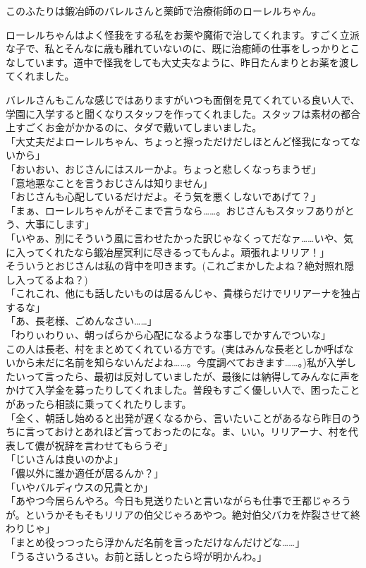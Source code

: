 \documentclass[oneside, a4paper]{jsbook}
\begin{document}
このふたりは鍛冶師のバレルさんと薬師で治療術師のローレルちゃん。

ローレルちゃんはよく怪我をする私をお薬や魔術で治してくれます。すごく立派な子で、私とそんなに歳も離れていないのに、既に治癒師の仕事をしっかりとこなしています。道中で怪我をしても大丈夫なように、昨日たんまりとお薬を渡してくれました。

バレルさんもこんな感じではありますがいつも面倒を見てくれている良い人で、学園に入学すると聞くなりスタッフを作ってくれました。スタッフは素材の都合上すごくお金がかかるのに、タダで戴いてしまいました。\\

\noindent
「大丈夫だよローレルちゃん、ちょっと擦っただけだしほとんど怪我になってないから」\\
「おいおい、おじさんにはスルーかよ。ちょっと悲しくなっちまうぜ」\\
「意地悪なことを言うおじさんは知りません」\\
「おじさんも心配しているだけだよ。そう気を悪くしないであげて？」\\
「まぁ、ローレルちゃんがそこまで言うなら……。おじさんもスタッフありがとう、大事にします」\\
「いやぁ、別にそういう風に言わせたかった訳じゃなくってだなァ……いや、気に入ってくれたなら鍛冶屋冥利に尽きるってもんよ。頑張れよリリア！」\\

そういうとおじさんは私の背中を叩きます。(これごまかしたよね？絶対照れ隠し入ってるよね？)\\

\noindent
「これこれ、他にも話したいものは居るんじゃ、貴様らだけでリリアーナを独占するな」\\
「あ、長老様、ごめんなさい……」\\
「わりぃわりぃ、朝っぱらから心配になるような事しでかすんでついな」\\

この人は長老、村をまとめてくれている方です。(実はみんな長老としか呼ばないから未だに名前を知らないんだよね……。今度調べておきます……。)私が入学したいって言ったら、最初は反対していましたが、最後には納得してみんなに声をかけて入学金を募ったりしてくれました。普段もすごく優しい人で、困ったことがあったら相談に乗ってくれたりします。\\

\noindent
「全く、朝話し始めると出発が遅くなるから、言いたいことがあるなら昨日のうちに言っておけとあれほど言っておったのにな。ま、いい。リリアーナ、村を代表して儂が祝辞を言わせてもらうぞ」\\
「じいさんは良いのかよ」\\
「儂以外に誰か適任が居るんか？」\\
「いやバルディウスの兄貴とか」\\
「あやつ今居らんやろ。今日も見送りたいと言いながらも仕事で王都じゃろうが。というかそもそもリリアの伯父じゃろあやつ。絶対伯父バカを炸裂させて終わりじゃ」\\
「まとめ役っつったら浮かんだ名前を言っただけなんだけどな……」\\
「うるさいうるさい。お前と話しとったら埒が明かんわ。」\\
\end{document}
